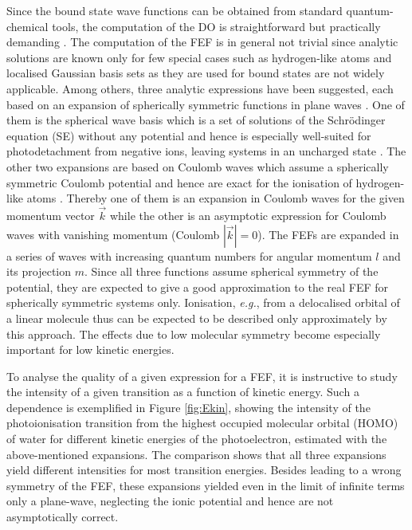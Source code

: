 Since the bound state wave functions can be obtained from standard quantum-chemical tools, the computation of the DO is straightforward but practically demanding \cite{MAgg}.
The computation of the FEF is in general not trivial since analytic solutions are known only for few special cases such as hydrogen-like atoms \cite{Lifschitz} and localised Gaussian basis sets as they are used for bound states are not widely applicable.
Among others, three analytic expressions have been suggested, each based on an expansion of spherically symmetric functions in plane waves \cite{ezDyson}.
One of them is the spherical wave basis which is a set of solutions of the Schr\"odinger equation (SE) without any potential and hence is especially well-suited for photodetachment from negative ions, leaving systems in an uncharged state \cite{ezDyson, DO_TDDFT}.
The other two expansions are based on Coulomb waves which assume a spherically symmetric Coulomb potential and hence are exact for the ionisation of hydrogen-like atoms \cite{Lifschitz}.
Thereby one of them is an expansion in Coulomb waves for the given momentum vector $\vec{k}$ while the other is an asymptotic expression for Coulomb waves with vanishing momentum (Coulomb $|\vec{k}|=0$).
The FEFs are expanded in a series of waves with increasing quantum numbers for angular momentum $l$ and its projection $m$.
Since all three functions assume spherical symmetry of the potential, they are expected to give a good approximation to the real FEF for spherically symmetric systems only.
Ionisation, \textit{e.g.}, from a delocalised orbital of a linear molecule thus can be expected to be described only approximately by this approach.
The effects due to low molecular symmetry become especially important for low kinetic energies.

To analyse the quality of a given expression for a FEF, it is instructive to study the intensity of a given transition as a function of kinetic energy.
Such a dependence is exemplified in Figure \ref{fig:Ekin}, showing the intensity of the photoionisation transition from the highest occupied molecular orbital (HOMO) of water for different kinetic energies of the photoelectron, estimated with the above-mentioned expansions.
The comparison shows that all three expansions yield different intensities for most transition energies.
Besides leading to a wrong symmetry of the FEF, these expansions yielded even in the limit of infinite terms only a plane-wave, neglecting the ionic potential and hence are not asymptotically correct.

